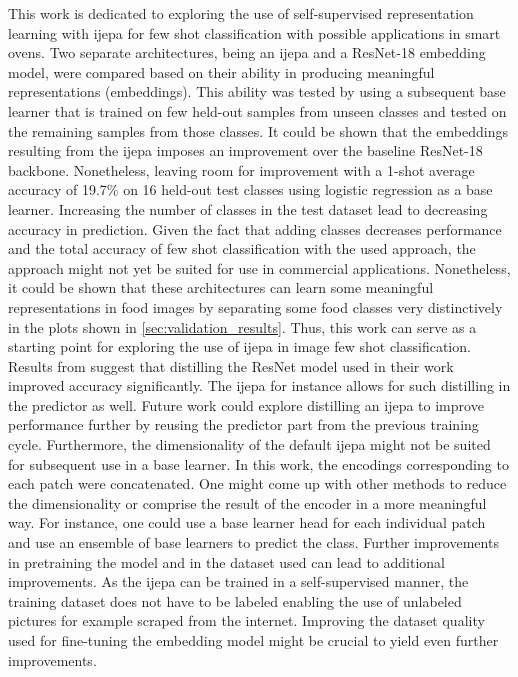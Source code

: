 This work is dedicated to exploring the use of self-supervised representation learning with \gls{ijepa} 
for few shot classification with possible applications in smart ovens. Two separate architectures, being 
an \gls{ijepa} and a ResNet-18 embedding model, were compared based on their ability in producing meaningful 
representations (embeddings). This ability was tested by using a subsequent base learner that is trained on 
few held-out samples from unseen classes and tested on the remaining samples from those classes. 
It could be shown that the embeddings resulting from the \gls{ijepa} imposes an improvement over the 
baseline ResNet-18 backbone. Nonetheless, leaving room for improvement with a 1-shot average accuracy of 19.7\% 
on 16 held-out test classes using logistic regression as a base learner. Increasing the number of classes 
in the test dataset lead to decreasing accuracy in prediction. Given the fact that adding classes decreases
performance and the total accuracy of few shot classification with the used approach, the approach might not yet 
be suited for use in commercial applications. Nonetheless, it could be shown that these architectures can 
learn some meaningful representations in food images by separating some food classes very distinctively in the plots shown in
\ref{sec:validation_results}. Thus, this work can serve as a starting point for exploring
the use of \gls{ijepa} in image few shot classification. Results from \cite{tian_rethinking_2020} suggest that 
distilling the ResNet model used in their work improved accuracy significantly. The \gls{ijepa} for instance allows
for such distilling in the predictor as well. Future work could explore distilling an \gls{ijepa} to improve performance
further by reusing the predictor part from the previous training cycle. Furthermore, the dimensionality of 
the default \gls{ijepa} might not be suited for subsequent use in a base learner. In this work, the encodings 
corresponding to each patch were concatenated. One might come up with other methods to reduce the dimensionality
or comprise the result of the encoder in a more meaningful way. For instance, one could use a base learner 
head for each individual patch and use an ensemble of base learners to predict the class. 
Further improvements in pretraining the model and in the dataset used can lead to additional improvements. As the 
\gls{ijepa} can be trained in a self-supervised manner, the training dataset does not have to be labeled enabling 
the use of unlabeled pictures for example scraped from the internet. Improving the dataset quality used for fine-tuning 
the embedding model might be crucial to yield even further improvements.


